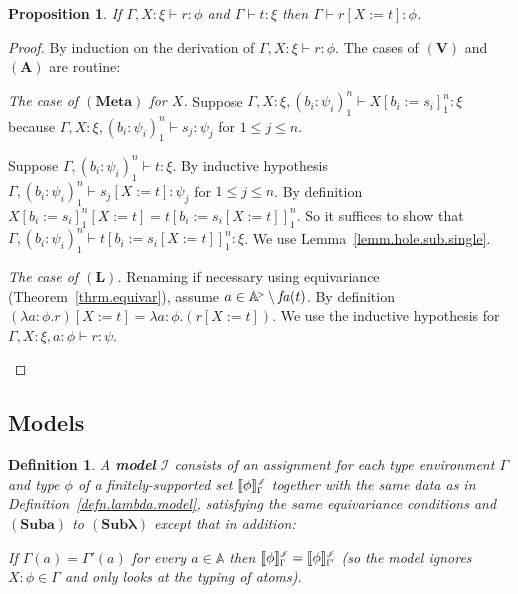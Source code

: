 \documentclass[submission,copyright]{eptcs}
\newtheorem{prop}[thrm]{Proposition}
\newtheorem{defn}[thrm]{Definition}
\newcommand{\rtm}{r}
\newcommand{\ttm}{t}
\newcommand{\deffont}[1]{\textbf{#1}}
\newcommand{\f}[1]{\ensuremath{\text{$\mathit{#1}$}}}
\newcommand{\lam}[1]{\lambda{#1}.}
\newcommand{\rulefont}[1]{\ensuremath{(\mathbf{#1})}}
\newcommand{\ssm}{:=}
\newcommand{\fa}{\f{fa}}
\newcommand\den[1]{{\hspace{.00ex}\scalebox{.55}{$#1$}}}
\newcommand{\idenot}[2]{\denot{\interp I}{#1}{#2}}
\newcommand\interp[1]{\ensuremath{\mathscr #1}}
\newcommand{\denot}[3]{\llbracket #3 \rrbracket_{\scalebox{.6}{$#2$}}^\den{#1}} \newcommand{\hdenot}[1]{\denot{\interp H}{}{#1}}
\newcommand\cent{\vdash}
\newcommand\atomsup{\mathbb A^{\hspace{-.3ex}{}_{{}^>}\!}} \newcommand\basesort{\tau}
\begin{document}
\begin{prop}
\label{prop.st.sub2}
If $\Gamma,X{:}\xi\cent \rtm{:}\phi$
and
$\Gamma\cent \ttm{:}\xi$
then
$\Gamma\cent \rtm[X\ssm\ttm]{:}\phi$.
\end{prop}
\begin{proof}
By induction on the derivation of $\Gamma,X{:}\xi\cent\rtm{:}\phi$.  The cases of \rulefont{V} and \rulefont{A} are routine: 
\begin{itemize*}
\item
\emph{The case of \rulefont{Meta} for $X$.}\quad
Suppose $\Gamma,X{:}\xi,(b_i{:}\psi_i)_1^n\cent X[b_i{\ssm} s_i]_1^n:\xi$ because $\Gamma,X{:}\xi,(b_i{:}\psi_i)_1^n\cent s_j:\psi_j$ for $1{\leq}j{\leq}n$.

Suppose $\Gamma,(b_i{:}\psi_i)_1^n\cent t:\xi$.
By inductive hypothesis $\Gamma,(b_i{:}\psi_i)_1^n\cent s_j[X{\ssm}\ttm]:\psi_j$ for $1{\leq}j{\leq}n$.
By definition $X[b_i{\ssm}s_i]_1^n[X{\ssm}\ttm]=\ttm[b_i{\ssm} s_i[X{\ssm}\ttm]]_1^n$.
So it suffices to show that $\Gamma,(b_i{:}\psi_i)_1^n\cent t[b_i{\ssm} s_i[X{\ssm}t]]_1^n:\xi$.
We use Lemma~\ref{lemm.hole.sub.single}.
\item
\emph{The case of \rulefont{L}.}\quad
Renaming if necessary using equivariance (Theorem~\ref{thrm.equivar}), assume $a\in\atomsup\setminus\fa(t)$.
By definition $(\lam{a{:}\phi}\rtm)[X{\ssm} \ttm]=\lam{a{:}\phi}(\rtm[X{\ssm}\ttm])$.
We use the inductive hypothesis for $\Gamma,X{:}\xi,a{:}\phi\cent \rtm:\psi$. 
\qedhere \end{itemize*}
\end{proof}


\subsection{Models}

\begin{defn}
\label{defn.holes.lambda.model}
A \deffont{model} $\interp I$ consists of an assignment for each type environment $\Gamma$ and type $\phi$ of a finitely-supported set $\idenot{\Gamma}{\phi}$ together with the same data as in Definition~\ref{defn.lambda.model}, satisfying the same equivariance conditions and \rulefont{Suba} to \rulefont{Sub{\text{$\lambda$}}} except that in addition:
\begin{enumerate*}
\setcounter{enumi}{7}
\item
If $\Gamma(a)=\Gamma'(a)$ for every $a\in\mathbb A$ then $\idenot{\Gamma}{\phi}=\idenot{\Gamma'}{\phi}$ (so the model ignores $X{:}\phi\in\Gamma$ and only looks at the typing of atoms).
\end{enumerate*}
\end{defn}
\end{document}
